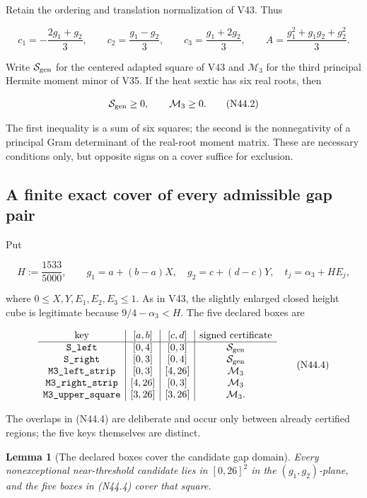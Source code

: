 \documentclass[11pt]{article}
\newtheorem{lemma}[theorem]{Lemma}
\theoremstyle{definition}
\theoremstyle{remark}
\begin{document}
Retain the ordering and translation normalization of V43.  Thus

\[
 c_1=-\frac{2g_1+g_2}{3},\qquad
 c_2= \frac{g_1-g_2}{3},\qquad
 c_3= \frac{g_1+2g_2}{3},
 \qquad
 A=\frac{g_1^2+g_1g_2+g_2^2}{3}.
\tag{N44.1}
\]

Write \(\mathcal S_{\rm gen}\) for the centered adapted square of V43
and \(\mathcal M_3\) for the third principal Hermite moment minor of
V35.  If the heat sextic has six real roots, then

\[
 \mathcal S_{\rm gen}\geq0,
 \qquad
 \mathcal M_3\geq0.
\tag{N44.2}
\]

The first inequality is a sum of six squares; the second is the
nonnegativity of a principal Gram determinant of the real-root moment
matrix.  These are necessary conditions only, but opposite signs on a
cover suffice for exclusion.

\subsection{A finite exact cover of every admissible gap pair}

Put

\[
 H:=\frac{1533}{5000},\qquad
 g_1=a+(b-a)X,\quad g_2=c+(d-c)Y,\quad
 t_j=\alpha_3+H E_j,
\tag{N44.3}
\]

where \(0\leq X,Y,E_1,E_2,E_3\leq1\).  As in V43, the slightly enlarged
closed height cube is legitimate because
\(9/4-\alpha_3<H\).  The five declared boxes are

\[
\begin{array}{c|c|c|c}
\text{key}&[a,b]&[c,d]&\text{signed certificate}\\ \hline
\texttt{S\_left}&[0,4]&[0,3]&\mathcal S_{\rm gen}\\
\texttt{S\_right}&[0,3]&[0,4]&\mathcal S_{\rm gen}\\
\texttt{M3\_left\_strip}&[0,3]&[4,26]&\mathcal M_3\\
\texttt{M3\_right\_strip}&[4,26]&[0,3]&\mathcal M_3\\
\texttt{M3\_upper\_square}&[3,26]&[3,26]&\mathcal M_3.
\end{array}
\tag{N44.4}
\]

The overlaps in \textup{(N44.4)} are deliberate and occur only between already
certified regions; the five keys themselves are distinct.

\begin{lemma}[The declared boxes cover the candidate gap domain]
\label{lem:f2v44-cover}
Every nonexceptional near-threshold candidate lies in
\([0,26]^2\) in the \((g_1,g_2)\)-plane, and the five boxes in
\textup{(N44.4)} cover that square.
\end{lemma}
\end{document}

